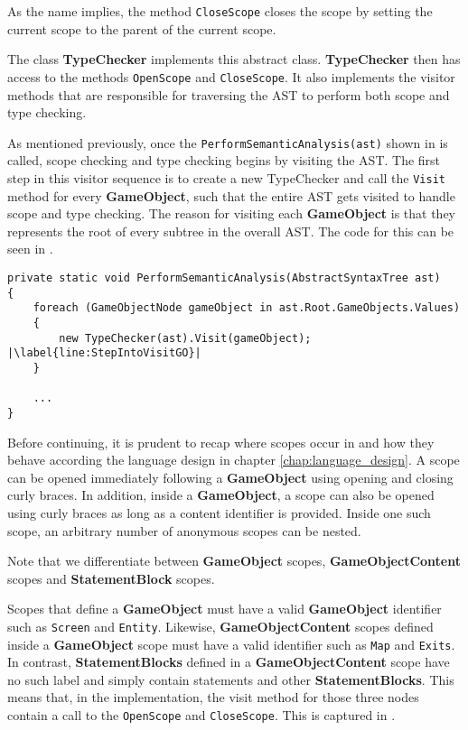 As the name implies, the method \texttt{CloseScope} closes the scope by setting the current scope to the parent of the current scope. 


The class \textbf{TypeChecker} implements this abstract class. \textbf{TypeChecker} then has access to the methods \texttt{OpenScope} and \texttt{CloseScope}. It also implements the visitor methods that are responsible for traversing the AST to perform both scope and type checking.

As mentioned previously, once the \texttt{PerformSemanticAnalysis(ast)} shown in  is called, scope checking and type checking begins by visiting the AST. The first step in this visitor sequence is to create a new TypeChecker and call the \texttt{Visit} method for every \textbf{GameObject}, such that the entire AST gets visited to handle scope and type checking. The reason for visiting each \textbf{GameObject} is that they represents the root of every subtree in the overall AST. The code for this can be seen in .

\begin{lstlisting}[language=CSharp, caption={A TypeChecker object is instantiated for every \textbf{GameObjectNode}.}, label={lst:TypeCheckEachGO},escapechar=|]
private static void PerformSemanticAnalysis(AbstractSyntaxTree ast)
{
    foreach (GameObjectNode gameObject in ast.Root.GameObjects.Values)
    {
        new TypeChecker(ast).Visit(gameObject); |\label{line:StepIntoVisitGO}|
    }

    ...
}
\end{lstlisting}

Before continuing, it is prudent to recap where scopes occur in \dazel{} and how they behave according the language design in chapter \ref{chap:language_design}. A scope can be opened immediately following a \textbf{GameObject} using opening and closing curly braces. In addition, inside a \textbf{GameObject}, a scope can also be opened using curly braces as long as a content identifier is provided. Inside one such scope, an arbitrary number of anonymous scopes can be nested. 

Note that we differentiate between \textbf{GameObject} scopes, \textbf{GameObjectContent} scopes and \textbf{StatementBlock} scopes.

Scopes that define a \textbf{GameObject} must have a valid \textbf{GameObject} identifier such as \texttt{Screen} and \texttt{Entity}. 
Likewise, \textbf{GameObjectContent} scopes defined inside a \textbf{GameObject} scope must have a valid identifier such as \texttt{Map} and \texttt{Exits}. In contrast, \textbf{StatementBlocks} defined in a \textbf{GameObjectContent} scope have no such label and simply contain statements and other \textbf{StatementBlocks}. 
This means that, in the implementation, the visit method for those three nodes contain a call to the \texttt{OpenScope} and \texttt{CloseScope}. This is captured in .

